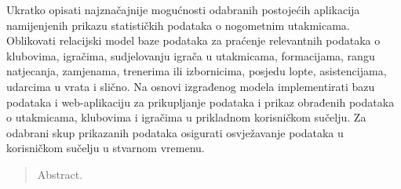 \documentclass[times, utf8, zavrsni]{fer}
\begin{document}
\begin{sazetak}
Ukratko opisati najznačajnije mogućnosti odabranih postojećih aplikacija namijenjenih prikazu statističkih
podataka o nogometnim utakmicama. Oblikovati relacijski model baze podataka za praćenje relevantnih
podataka o klubovima, igračima, sudjelovanju igrača u utakmicama, formacijama, rangu natjecanja,
zamjenama, trenerima ili izbornicima, posjedu lopte, asistencijama, udarcima u vrata i slično. Na osnovi
izgrađenog modela implementirati bazu podataka i web-aplikaciju za prikupljanje podataka i prikaz obrađenih
podataka o utakmicama, klubovima i igračima u prikladnom korisničkom sučelju. Za odabrani skup prikazanih
podataka osigurati osvježavanje podataka u korisničkom sučelju u stvarnom vremenu.

\end{sazetak}

\begin{abstract}
Abstract.

\end{abstract}
\end{document}
